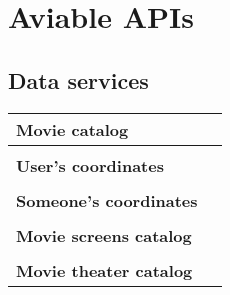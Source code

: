 \chapter{Aviable APIs}
	\section{Data services} \label{appendix.schema.dataServices}
		{\footnotesize
					\begin{tabular}{p{3cm}l}
						\textbf{Movie catalog} &

						   \begin{minipage}[t]{0.8\textwidth}
									\imdbMovieCatalog
							\end{minipage} \\
						\hline
						\\
						\textbf{User's coordinates} & 	\begin{minipage}[t]{0.8\textwidth}
							\latitudeCoordinates
							\end{minipage} \\
						\hline
						\\
						\textbf{Someone's coordinates} & 	\begin{minipage}[t]{0.8\textwidth}
							\latitudeYourCoordinates
							\end{minipage} \\
						\hline
						\\

						\textbf{Movie screens catalog} &	\begin{minipage}[t]{0.8\textwidth}
							\patheScreening
							\end{minipage} \\
						\hline
						\\

						\textbf{Movie theater catalog} & \begin{minipage}[t]{0.8\textwidth}
							\patheTheater
							\end{minipage}
				\end{tabular}
		}

